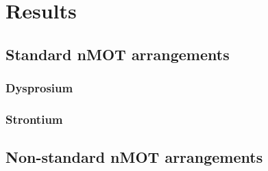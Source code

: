 %
\chapter{Results}
\label{ch:results}
% 

%
\section{Standard nMOT arrangements}
%


%
\subsection{Dysprosium}
%


%
\subsection{Strontium}
%

%
\section{Non-standard nMOT arrangements}
%